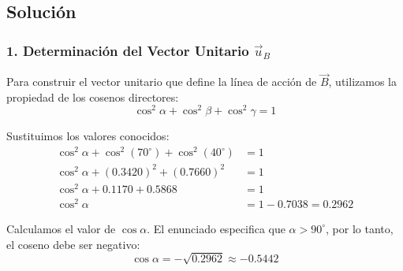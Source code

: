 \documentclass[12pt, a4paper]{article}
\begin{document}
\begin{center}
\end{center}

\subsection*{Solución}

\subsubsection*{1. Determinación del Vector Unitario $\vec{u}_B$}
Para construir el vector unitario que define la línea de acción de $\vec{B}$, utilizamos la propiedad de los cosenos directores:
\begin{equation}
    \cos^2 \alpha + \cos^2 \beta + \cos^2 \gamma = 1
\end{equation}

Sustituimos los valores conocidos:
\begin{align*}
    \cos^2 \alpha + \cos^2(70^\circ) + \cos^2(40^\circ) &= 1 \\
    \cos^2 \alpha + (0.3420)^2 + (0.7660)^2 &= 1 \\
    \cos^2 \alpha + 0.1170 + 0.5868 &= 1 \\
    \cos^2 \alpha &= 1 - 0.7038 = 0.2962
\end{align*}

Calculamos el valor de $\cos \alpha$. El enunciado especifica que $\alpha > 90^\circ$, por lo tanto, el coseno debe ser negativo:
\begin{equation*}
    \cos \alpha = -\sqrt{0.2962} \approx -0.5442
\end{equation*}
\end{document}
